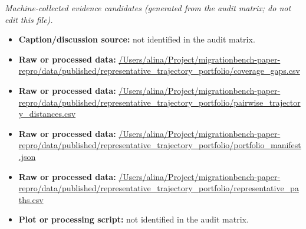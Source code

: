 \emph{Machine-collected evidence candidates (generated from the audit matrix; do not edit this file).}
\begin{itemize}[leftmargin=1.4em,noitemsep]
\item \textbf{Caption/discussion source:} not identified in the audit matrix.
\item \textbf{Raw or processed data:} \url{/Users/alina/Project/migrationbench-paper-repro/data/published/representative_trajectory_portfolio/coverage_gaps.csv}
\item \textbf{Raw or processed data:} \url{/Users/alina/Project/migrationbench-paper-repro/data/published/representative_trajectory_portfolio/pairwise_trajectory_distances.csv}
\item \textbf{Raw or processed data:} \url{/Users/alina/Project/migrationbench-paper-repro/data/published/representative_trajectory_portfolio/portfolio_manifest.json}
\item \textbf{Raw or processed data:} \url{/Users/alina/Project/migrationbench-paper-repro/data/published/representative_trajectory_portfolio/representative_paths.csv}
\item \textbf{Plot or processing script:} not identified in the audit matrix.
\end{itemize}
